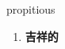 
\begin{frame}
{\huge propitious}
\begin{center}
\begin{enumerate}\Large
  \item \textbf{吉祥的}
\end{enumerate}
\end{center}
\end{frame}
